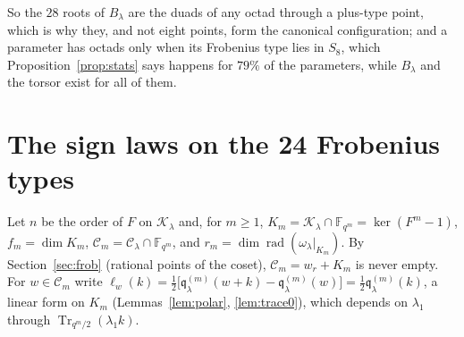 \documentclass[12pt,a4paper]{amsart}
\theoremstyle{definition}
\newcommand{\F}{\mathbb{F}}
\newcommand{\Tr}{\operatorname{Tr}}
\newcommand{\rad}{\operatorname{rad}}
\newcommand{\Kk}{\mathcal{K}}
\newcommand{\Cc}{\mathcal{C}}
\newcommand{\qq}{\mathfrak{q}}
\begin{document}
So the $28$ roots of $B_\lambda$ are the duads of any octad through a plus-type point, which is why they, and not eight points, form the canonical configuration; and a parameter has octads only when its Frobenius type lies in $S_8$, which Proposition~\ref{prop:stats} says happens for $79\%$ of the parameters, while $B_\lambda$ and the torsor exist for all of them.

\section{The sign laws on the 24 Frobenius types}\label{sec:signs}

Let $n$ be the order of $F$ on $\Kk_\lambda$ and, for $m\ge1$, $K_m=\Kk_\lambda\cap\F_{q^m}=\ker(F^m-1)$, $f_m=\dim K_m$, $\Cc_m=\Cc_\lambda\cap\F_{q^m}$, and $r_m=\dim\rad(\omega_\lambda|_{K_m})$. By Section~\ref{sec:frob} (rational points of the coset), $\Cc_m=w_r+K_m$ is never empty. For $w\in\Cc_m$ write $\ell_w(k)=\frac12\bigl[\qq^{(m)}_\lambda(w+k)-\qq^{(m)}_\lambda(w)\bigr]=\frac12\qq^{(m)}_\lambda(k)$, a linear form on $K_m$ (Lemmas~\ref{lem:polar}, \ref{lem:trace0}), which depends on $\lambda_1$ through $\Tr_{q^m/2}(\lambda_1k)$.
\end{document}
